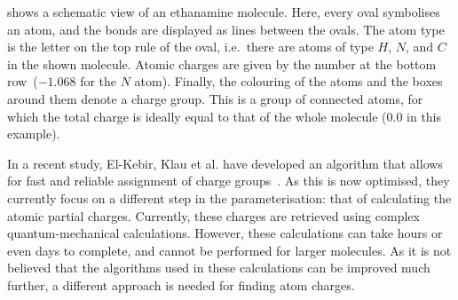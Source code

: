  shows a schematic view of an ethanamine molecule. Here, every oval symbolises an atom, and the bonds are displayed as lines between the ovals. The atom type is the letter on the top rule of the oval, i.e.\ there are atoms of type $H$, $N$, and $C$ in the shown molecule. Atomic charges are given by the number at the bottom row~($-1.068$ for the $N$ atom). Finally, the colouring of the atoms and the boxes around them denote a charge group. This is a group of connected atoms, for which the total charge is ideally equal to that of the whole molecule ($0.0$ in this example).

In a recent study, El-Kebir, Klau et al. have developed an algorithm that allows for fast and reliable assignment of charge groups~\cite{canzar2012charge}. As this is now optimised, they currently focus on a different step in the parameterisation: that of calculating the atomic partial charges. Currently, these charges are retrieved using complex quantum-mechanical calculations. However, these calculations can take hours or even days to complete, and cannot be performed for larger molecules. As it is not believed that the algorithms used in these calculations can be improved much further, a different approach is needed for finding atom charges.

